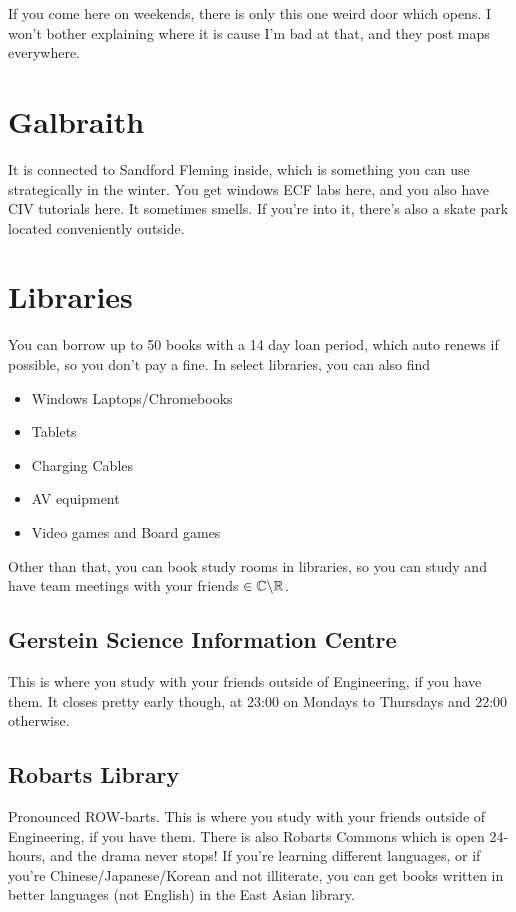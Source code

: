 If you come here on weekends, there is only this one weird door which opens. I won't bother explaining where it is cause I'm bad at that, and they post maps everywhere.

\section{Galbraith}

It is connected to Sandford Fleming inside, which is something you can use strategically in the winter. You get windows ECF labs here, and you also have CIV tutorials here. It sometimes smells. If you're into it, there's also a skate park located conveniently outside.

\section{Libraries}

You can borrow up to 50 books with a 14 day loan period, which auto renews if possible, so you don't pay a fine. In select libraries, you can also find

\begin{itemize}
    \item Windows Laptops/Chromebooks
    \item Tablets
    \item Charging Cables
    \item AV equipment
    \item Video games and Board games
\end{itemize}

Other than that, you can book study rooms in libraries, so you can study and have team meetings with your friends $\in \mathbb{C}\backslash\mathbb{R}$.

\subsection{Gerstein Science Information Centre}

This is where you study with your friends outside of Engineering, if you have them. It closes pretty early though, at 23:00 on Mondays to Thursdays and 22:00 otherwise.

\subsection{Robarts Library}

Pronounced ROW-barts. This is where you study with your friends outside of Engineering, if you have them. There is also Robarts Commons which is open 24-hours, and the drama never stops! If you're learning different languages, or if you're Chinese/Japanese/Korean and not illiterate, you can get books written in better languages (not English) in the East Asian library.

